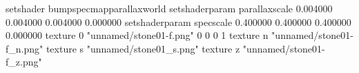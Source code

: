 setshader bumpspecmapparallaxworld
setshaderparam parallaxscale 0.004000 0.004000 0.004000 0.000000
setshaderparam specscale 0.400000 0.400000 0.400000 0.000000
texture 0 "unnamed/stone01-f.png" 0 0 0 1
texture n "unnamed/stone01-f_n.png"
texture s "unnamed/stone01_s.png"
texture z "unnamed/stone01-f_z.png"